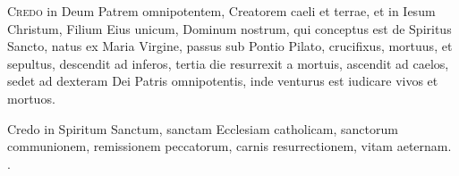 \documentclass[20pt]{extarticle}
\begin{document}
    \begin{center}
        \vspace{1em}
    \end{center}

    \lettrine[lines=4]{C}{redo} in Deum Patrem omnipotentem,
    Creatorem caeli et terrae,
    et in Iesum Christum, Filium Eius unicum, Dominum nostrum,
    qui conceptus est de Spiritus Sancto, natus ex Maria Virgine,
    passus sub Pontio Pilato, crucifixus, mortuus, et sepultus,
    descendit ad inferos, tertia die resurrexit a mortuis,
    ascendit ad caelos, sedet ad dexteram Dei Patris omnipotentis,
    inde venturus est iudicare vivos et mortuos.

    Credo in Spiritum Sanctum,
    sanctam Ecclesiam catholicam, sanctorum communionem,
    remissionem peccatorum,
    carnis resurrectionem,
    vitam aeternam.
    \amen.
\end{document}
